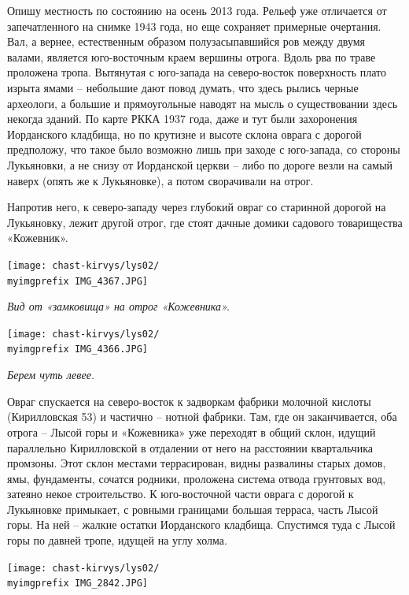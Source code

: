 Опишу местность по состоянию на осень 2013 года. Рельеф уже отличается от запечатленного на снимке 1943 года, но еще сохраняет примерные очертания. Вал, а вернее, естественным образом полузасыпавшийся ров между двумя валами, является юго-восточным краем вершины отрога. Вдоль рва по траве проложена тропа. Вытянутая с юго-запада на северо-восток поверхность плато изрыта ямами – небольшие дают повод думать, что здесь рылись черные археологи, а большие и прямоугольные наводят на мысль о существовании здесь некогда зданий. По карте РККА 1937 года, даже и тут были захоронения Иорданского кладбища, но по крутизне и высоте склона оврага с дорогой предположу, что такое было возможно лишь при заходе с юго-запада, со стороны Лукьяновки, а не снизу от Иорданской церкви – либо по дороге везли на самый наверх (опять же к Лукьяновке), а потом сворачивали на отрог.

Напротив него, к северо-западу через глубокий овраг со старинной дорогой на Лукьяновку, лежит другой отрог, где стоят дачные домики садового товарищества «Кожевник». 

\begin{center}
\texttt{[image: chast-kirvys/lys02/\\myimgprefix IMG\_4367.JPG]}

\textit{Вид от «замковища» на отрог «Кожевника».}
\end{center}

\begin{center}
\texttt{[image: chast-kirvys/lys02/\\myimgprefix  IMG\_4366.JPG]}

\textit{Берем чуть левее.}
\end{center}

\newpage

Овраг спускается на северо-восток к задворкам фабрики молочной кислоты (Кирилловская 53) и частично – нотной фабрики. Там, где он заканчивается, оба отрога – Лысой горы и «Кожевника» уже переходят в общий склон, идущий параллельно Кирилловской в отдалении от него на расстоянии квартальчика промзоны. Этот склон местами террасирован, видны развалины старых домов, ямы, фундаменты, сочатся родники, проложена система отвода грунтовых вод, затеяно некое строительство. К юго-восточной части оврага с дорогой к Лукьяновке примыкает, с ровными границами большая терраса, часть Лысой горы. На ней – жалкие остатки Иорданского кладбища. Спустимся туда с Лысой горы по давней тропе, идущей на углу холма.

\begin{center}
\texttt{[image: chast-kirvys/lys02/\\myimgprefix IMG\_2842.JPG]}
\end{center}

